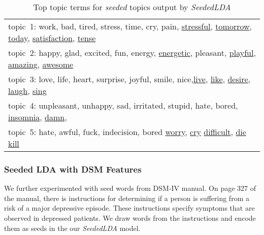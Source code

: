 \begin{table*} [ht!]
	\begin{tabular}{ l }
	\hline
{topic~1: work, bad, tired, stress, time, cry, pain, \underline{stressful}, \underline{tomorrow}, \underline{today}, \underline{satisfaction}, \underline{tense}}\\
{topic~2: happy, glad, excited, fun, energy, \underline{energetic}, pleasant, \underline{playful}, \underline{amazing}, \underline{awesome}}\\
{topic~3: love, life, heart, surprise, joyful, smile, nice,\underline{live}, \underline{like}, \underline{desire}, \underline{laugh}, \underline{sing}}\\
{topic~4: unpleasant, unhappy, sad, irritated, stupid, hate, bored, \underline {insomnia}, \underline{damn}, }\\
{topic~5: hate, awful, fuck, indecision, bored \underline{worry}, \underline{cry} \underline{difficult}, \underline{die} \underline{kill}}\\
\hline
    \end{tabular}
      \caption{\noindent Top topic terms for \textit{seeded} topics output by \textit{SeededLDA}}
        \label{table:seedwords_2}
\end{table*}

\subsubsection{Seeded LDA with DSM Features}
\label{sec:seededldadsm}
We further experimented with seed words from DSM-IV manual\cite{dsm4}. On page 327 of the manual, there is instructions for determining if a person is suffering from a risk of a major depressive episode. These instructions specify symptoms that are observed in depressed patients. We draw words from the instructions and encode them as seeds in the our \textit{SeededLDA} model.

